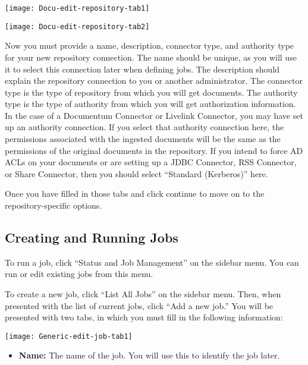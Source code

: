 \begin{changemargin}{1.5in}{0in}
\texttt{[image: Docu-edit-repository-tab1]}

\texttt{[image: Docu-edit-repository-tab2]}

Now you must provide a name, description, connector type, and authority
type for your new repository connection. The name should be unique,
as you will use it to select this connection later when defining
jobs. The description should explain the repository connection to you
or another administrator.  The connector type is the type of repository
from which you will get documents. The authority type is the type of
authority from which you will get authorization information. In the case
of a Documentum Connector or Livelink Connector, you may have set up an
authority connection. If you select that authority connection here, the
permissions associated with the ingested documents will be the same as the
permissions of the original documents in the repository. If you intend
to force AD ACLs on your documents or are setting up a JDBC Connector,
RSS Connector, or Share Connector, then you should select ``Standard
(Kerberos)'' here.

Once you have filled in those tabs and click continue to move on to
the repository-specific options.











\subsection{Creating and Running Jobs}

To run a job, click ``Status and Job Management'' on the sidebar menu.
You can run or edit existing jobs from this menu.

To create a new job, click ``List All Jobs'' on the sidebar menu. Then, when
presented with the list of current jobs, click ``Add a new job.'' You
will be presented with two tabs, in which you must fill in the following
information:

\texttt{[image: Generic-edit-job-tab1]}

\begin{itemize}

\item \textbf{Name:} The name of the job. You will use this to identify
the job later.


\end{itemize}
\end{changemargin}
